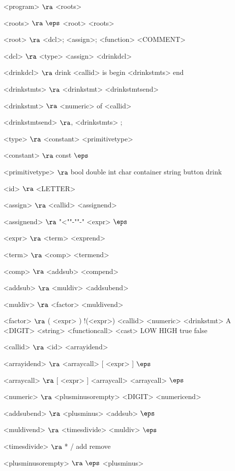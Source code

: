 \begin{grammar}
<program> $\ra$ <roots>

<roots> $\ra$ $\eps$
\alt <root> <roots>
 
<root> $\ra$ <dcl>;
\alt <assign>;
\alt <function>
\alt <COMMENT>

<dcl> $\ra$ <type> <assign>
	\alt <drinkdcl>

<drinkdcl> $\ra$ drink <callid> is begin <drinkstmts> end

<drinkstmts> $\ra$ <drinkstmt> <drinkstmtsend>

<drinkstmt> $\ra$ <numeric> of <callid>

<drinkstmtsend> $\ra$, <drinkstmts>
\alt ;

<type> $\ra$ <constant> <primitivetype>

<constant> $\ra$ const
\alt $\eps$

<primitivetype> $\ra$ bool
\alt double
\alt int
\alt char
\alt container
\alt string
\alt button
\alt drink

<id> $\ra$ <LETTER>

<assign> $\ra$ <callid> <assignend>

<assignend> $\ra$ "<""-""-" <expr>
\alt $\eps$

<expr> $\ra$ <term> <exprend>

<term> $\ra$ <comp> <termend>

<comp> $\ra$ <addsub> <compend>

<addsub> $\ra$ <muldiv> <addsubend>

<muldiv> $\ra$ <factor> <muldivend>

<factor> $\ra$ ( <expr> )
	\alt !(<expr>)
	\alt <callid>
	\alt <numeric>
	\alt <drinkstmt>
	\alt A <DIGIT>
	\alt <string>
	\alt <functioncall> 
	\alt <cast>
	\alt LOW
	\alt HIGH
	\alt true
	\alt false

<callid> $\ra$ <id> <arrayidend>

<arrayidend> $\ra$ <arraycall> [ <expr> ]
\alt $\eps$

<arraycall> $\ra$   [ <expr> ] <arraycall>
\alt  [ ] <arraycall>
\alt $\eps$

<numeric> $\ra$ <plusminusorempty> <DIGIT> <numericend>

<addsubend> $\ra$ <plusminus> <addsub>
\alt $\eps$

<muldivend> $\ra$ <timesdivide> <muldiv>
\alt $\eps$

<timesdivide> $\ra$ *
\alt /
\alt add
\alt remove

<plusminusorempty> $\ra$ $\eps$
\alt <plusminus>


\end{grammar}
